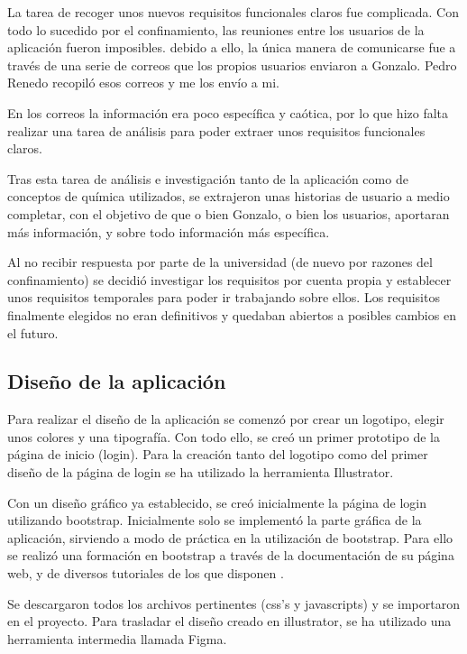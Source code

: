 La tarea de recoger unos nuevos requisitos funcionales claros fue complicada. Con todo lo sucedido por el confinamiento, las reuniones entre los usuarios de la aplicación fueron imposibles. debido a ello, la única manera de comunicarse fue a través de una serie de correos que los propios usuarios enviaron a Gonzalo. Pedro Renedo recopiló esos correos y me los envío a mi.

En los correos la información era poco específica y caótica, por lo que hizo falta realizar una tarea de análisis para poder extraer unos requisitos funcionales claros. 

Tras esta tarea de análisis e investigación tanto de la aplicación como de conceptos de química utilizados, se extrajeron unas historias de usuario a medio completar, con el objetivo de que o bien Gonzalo, o bien los usuarios, aportaran más información, y sobre todo información más específica. 

Al no recibir respuesta por parte de la universidad (de nuevo por razones del confinamiento) se decidió investigar los requisitos por cuenta propia y establecer unos requisitos temporales para poder ir trabajando sobre ellos. Los requisitos finalmente elegidos no eran definitivos y quedaban abiertos a posibles cambios en el futuro.


\subsection{Diseño de la aplicación}

Para realizar el diseño de la aplicación se comenzó por crear un logotipo, elegir unos colores y una tipografía. Con todo ello, se creó un primer prototipo de la página de inicio (login). Para la creación tanto del logotipo como del primer diseño de la página de login se ha utilizado la herramienta Illustrator. 

Con un diseño gráfico ya establecido, se creó inicialmente la página de login utilizando bootstrap. Inicialmente solo se implementó la parte gráfica de la aplicación, sirviendo a modo de práctica en la utilización de bootstrap. Para ello se realizó una formación en bootstrap a través de la documentación de su página web, y de diversos tutoriales de los que disponen \cite{doc:Bootstrap4}.

Se descargaron todos los archivos pertinentes (css's y javascripts) y se importaron en el proyecto. Para trasladar el diseño creado en illustrator, se ha utilizado una herramienta intermedia llamada Figma.

